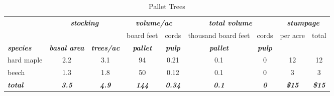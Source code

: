 \documentclass[landscape]{article}
\begin{document}
\begin{table}[H]

\caption{\label{tab:unnamed-chunk-48}Pallet Trees}
\fontsize{10}{12}\selectfont
\begin{tabular}[t]{lcccccccc}
\toprule
\multicolumn{1}{c}{\em{\textbf{ }}} & \multicolumn{2}{c}{\em{\textbf{stocking}}} & \multicolumn{2}{c}{\em{\textbf{volume/ac }}} & \multicolumn{2}{c}{\em{\textbf{total volume}}} & \multicolumn{2}{c}{\em{\textbf{stumpage}}} \\
\cmidrule(l{3pt}r{3pt}){2-3} \cmidrule(l{3pt}r{3pt}){4-5} \cmidrule(l{3pt}r{3pt}){6-7} \cmidrule(l{3pt}r{3pt}){8-9}
\multicolumn{3}{c}{ } & \multicolumn{1}{c}{board feet} & \multicolumn{1}{c}{cords} & \multicolumn{1}{c}{thousand board feet} & \multicolumn{1}{c}{cords} & \multicolumn{1}{c}{per acre} & \multicolumn{1}{c}{total} \\
\cmidrule(l{3pt}r{3pt}){4-4} \cmidrule(l{3pt}r{3pt}){5-5} \cmidrule(l{3pt}r{3pt}){6-6} \cmidrule(l{3pt}r{3pt}){7-7} \cmidrule(l{3pt}r{3pt}){8-8} \cmidrule(l{3pt}r{3pt}){9-9}
\rowcolor[HTML]{DCDCDC}  \em{\textbf{species}} & \em{\textbf{basal area}} & \em{\textbf{trees/ac}} & \em{\textbf{pallet}} & \em{\textbf{pulp}} & \em{\textbf{pallet}} & \em{\textbf{pulp}} & \em{\textbf{ }} & \em{\textbf{ }}\\
\midrule
\rowcolor{gray!6}  hard maple & 2.2 & 3.1 & 94 & 0.21 & 0.1 & 0 & 12 & 12\\
 
beech & 1.3 & 1.8 & 50 & 0.12 & 0.1 & 0 & 3 & 3\\
 
\rowcolor{gray!6}  \rowcolor[HTML]{DCDCDC}  \em{\textbf{total}} & \em{\textbf{3.5}} & \em{\textbf{4.9}} & \em{\textbf{144}} & \em{\textbf{0.34}} & \em{\textbf{0.1}} & \em{\textbf{0}} & \em{\textbf{\$15}} & \em{\textbf{\$15}}\\
\bottomrule
\end{tabular}
\end{table}
\end{document}
